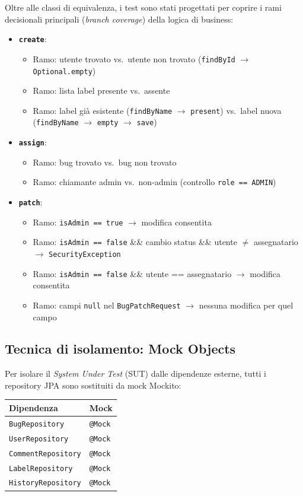 ﻿\documentclass[a4paper,11pt]{article}
\begin{document}
Oltre alle classi di equivalenza, i test sono stati progettati per coprire i rami decisionali principali (\emph{branch coverage}) della logica di business:

\begin{itemize}
  \item \textbf{\texttt{create}}:
  \begin{itemize}
    \item Ramo: utente trovato vs.\ utente non trovato (\texttt{findById} $\to$ \texttt{Optional.empty})
    \item Ramo: lista label presente vs.\ assente
    \item Ramo: label gi\`a esistente (\texttt{findByName} $\to$ \texttt{present}) vs.\ label nuova (\texttt{findByName} $\to$ \texttt{empty} $\to$ \texttt{save})
  \end{itemize}
  \item \textbf{\texttt{assign}}:
  \begin{itemize}
    \item Ramo: bug trovato vs.\ bug non trovato
    \item Ramo: chiamante admin vs.\ non-admin (controllo \texttt{role == ADMIN})
  \end{itemize}
  \item \textbf{\texttt{patch}}:
  \begin{itemize}
    \item Ramo: \texttt{isAdmin == true} $\to$ modifica consentita
    \item Ramo: \texttt{isAdmin == false} \&\& cambio status \&\& utente $\neq$ assegnatario $\to$ \texttt{SecurityException}
    \item Ramo: \texttt{isAdmin == false} \&\& utente == assegnatario $\to$ modifica consentita
    \item Ramo: campi \texttt{null} nel \texttt{BugPatchRequest} $\to$ nessuna modifica per quel campo
  \end{itemize}
\end{itemize}

\subsection{Tecnica di isolamento: Mock Objects}

Per isolare il \emph{System Under Test} (SUT) dalle dipendenze esterne, tutti i repository JPA sono sostituiti da mock Mockito:

\begin{tabular}{|l|l|}
\hline
\textbf{Dipendenza} & \textbf{Mock} \\
\hline
\texttt{BugRepository} & \texttt{@Mock} \\
\hline
\texttt{UserRepository} & \texttt{@Mock} \\
\hline
\texttt{CommentRepository} & \texttt{@Mock} \\
\hline
\texttt{LabelRepository} & \texttt{@Mock} \\
\hline
\texttt{HistoryRepository} & \texttt{@Mock} \\
\hline
\end{tabular}
\end{document}
